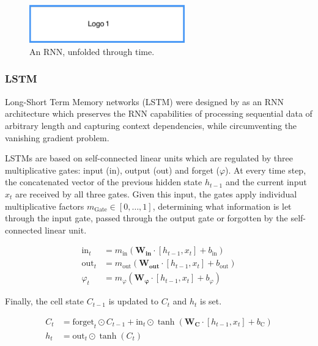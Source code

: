 \begin{figure}[htb]
 \centering
 \includegraphics[width=0.6\textwidth]{fig/logo1}
 \caption[Unfolded RNN]{An RNN, unfolded through time.}
\label{fig:unrolledRNN}
\end{figure}


\subsubsection{LSTM}\label{LSTM}

Long-Short Term Memory networks (LSTM) were designed by \cite{Hochreiter1997} as an RNN architecture which preserves the RNN capabilities of processing sequential data of arbitrary length and capturing context dependencies, while circumventing the vanishing gradient problem.

LSTMs are based on self-connected linear units which are regulated by three multiplicative gates: input (in), output (out) and forget ($\varphi$). At every time step, the concatenated vector of the previous hidden state $h_{t-1}$ and the current input $x_{t}$ are received by all three gates. Given this input, the gates apply individual multiplicative factors $m_{\text{Gate}} \in [0, \dots, 1]$, determining what information is let through the input gate, passed through the output gate or forgotten by the self-connected linear unit.

\begin{align*}
\text{in}_{t} &= m_{\text{in}} (\boldsymbol{W_{\text{in}}} \cdot [h_{t-1},x_{t}] + b_{\text{in}}) \\
\text{out}_{t} &= m_{\text{out}} (\boldsymbol{W_{\text{out}}} \cdot [h_{t-1},x_{t}] + b_{\text{out}}) \\
\varphi_{t} &= m_{\varphi} (\boldsymbol{W_{\varphi}} \cdot [h_{t-1},x_{t}] + b_{\varphi})
\end{align*}

Finally, the cell state $C_{t-1}$ is updated to $C_{t}$ and $h_{t}$ is set.

\begin{align*}
C_{t} &= \text{forget}_{t} \odot C_{t-1} + \text{in}_{t} \odot \tanh (\boldsymbol{W_{C}} \cdot [h_{t-1},x_{t}] + b_{\text{C}}) \\
h_{t} &= \text{out}_{t} \odot \tanh (C_{t})
\end{align*}

